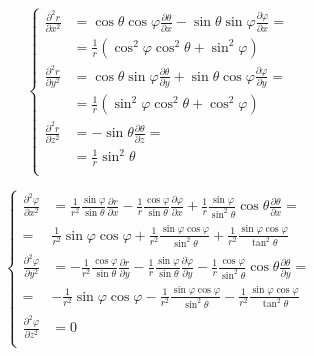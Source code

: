 \documentclass
[
a4paper,                      %
twoside,					  %
12pt,                         %
abstract,		      %
fleqn,                        %
]
{scrartcl} %
\begin{document}
\begin{description}
\begin{equation}
\begin{cases}
\frac{\partial^{2} r}{\partial x^{2}}&=\cos{\theta}\cos{\varphi}\frac{\partial \theta}{\partial x}-\sin{\theta}\sin{\varphi}\frac{\partial\varphi}{\partial x}=\\&=\frac{1}{r}\left(\cos^{2}{\varphi}\cos^{2}{\theta}+\sin^{2}{\varphi}\right)\\
\frac{\partial^{2} r}{\partial y^{2}}&=\cos{\theta}\sin{\varphi}\frac{\partial \theta}{\partial y}+\sin{\theta}\cos{\varphi}\frac{\partial\varphi}{\partial y}=\\&=\frac{1}{r}\left(\sin^{2}{\varphi}\cos^{2}{\theta}+\cos^{2}{\varphi}\right)\\
\frac{\partial^{2} r}{\partial z^{2}}&=-\sin{\theta}\frac{\partial\theta}{\partial z}=\\&=\frac{1}{r}\sin^{2}{\theta}\\
\end{cases}
\end{equation}

\begin{equation}
\begin{cases}
\frac{\partial^{2} \varphi}{\partial x^{2}}&=\frac{1}{r^{2}}\frac{\sin{\varphi}}{\sin{\theta}}\frac{\partial r}{\partial x}-\frac{1}{r}\frac{\cos{\varphi}}{\sin{\theta}}\frac{\partial\varphi}{\partial x}+\frac{1}{r}\frac{\sin{\varphi}}{\sin^{2}{\theta}}\cos{\theta}\frac{\partial\theta}{\partial x}=\\=&\frac{1}{r^{2}}\sin{\varphi}\cos{\varphi}+\frac{1}{r^{2}}\frac{\sin{\varphi}\cos{\varphi}}{\sin^{2}{\theta}}+\frac{1}{r^{2}}\frac{\sin{\varphi}\cos{\varphi}}{\tan^{2}{\theta}}\\
\frac{\partial^{2} \varphi}{\partial y^{2}}&=-\frac{1}{r^{2}}\frac{\cos{\varphi}}{\sin{\theta}}\frac{\partial r}{\partial y}-\frac{1}{r}\frac{\sin{\varphi}}{\sin{\theta}}\frac{\partial\varphi}{\partial y}-\frac{1}{r}\frac{\cos{\varphi}}{\sin^{2}{\theta}}\cos{\theta}\frac{\partial\theta}{\partial y}=\\=&-\frac{1}{r^{2}}\sin{\varphi}\cos{\varphi}-\frac{1}{r^{2}}\frac{\sin{\varphi}\cos{\varphi}}{\sin^{2}{\theta}}-\frac{1}{r^{2}}\frac{\sin{\varphi}\cos{\varphi}}{\tan^{2}{\theta}}\\
\frac{\partial^{2} \varphi}{\partial z^{2}}&=0\\
\end{cases}
\end{equation}


\end{description}
\end{document}

